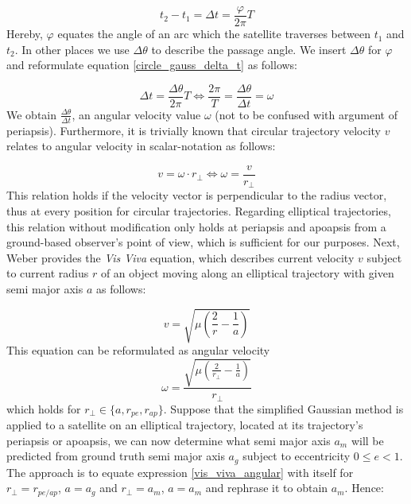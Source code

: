 \documentclass[11pt,a4paper]{article}
\begin{document}
	\begin{equation}
		\label{circle_gauss_delta_t}
		t_2 - t_1 = \Delta t=\frac{\varphi}{2\pi}T
	\end{equation} 
	\newline
	Hereby, $\varphi$ equates the angle of an arc which the satellite traverses between $t_1$ and $t_2$. \cite{orbit_determination_preliminary}\newline In other places we use $\Delta \theta$ to describe the passage angle. We insert $\Delta \theta$ for $\varphi$ and reformulate equation \ref{circle_gauss_delta_t} as follows:
	
	\begin{equation*}
		\Delta t=\frac{\Delta \theta}{2\pi}T \Leftrightarrow \frac{2\pi}{T}=\frac{\Delta \theta}{\Delta t}=\omega
	\end{equation*}
	We obtain $\frac{\Delta \theta}{\Delta t}$, an angular velocity value $\omega$ (not to be confused with argument of periapsis). Furthermore, it is trivially known that circular trajectory velocity $v$ relates to angular velocity in scalar-notation as follows:
	
	\begin{equation}
		v = \omega \cdot r_{\perp} \Leftrightarrow \omega = \frac{v}{r_{\perp}}
	\end{equation}
	This relation holds if the velocity vector is perpendicular to the radius vector, thus at every position for circular trajectories. Regarding elliptical trajectories, this relation without modification only holds at periapsis and apoapsis from a ground-based observer's point of view, which is sufficient for our purposes.\newline
	Next, Weber provides the \emph{Vis Viva} equation, which describes current velocity $v$ subject to current radius $r$ of an object moving along an elliptical trajectory with given semi major axis $a$ as follows:
	
	\begin{equation}
		\label{vis_viva}
		v=\sqrt{\mu\left(\frac{2}{r}-\frac{1}{a}\right)}
	\end{equation}
	\cite{hohmann_transfer}\newline
	This equation can be reformulated as angular velocity
	\begin{equation}
		\label{vis_viva_angular}
		\omega=\frac{\sqrt{\mu\left(\frac{2}{r_{\perp}}-\frac{1}{a}\right)}}{r_{\perp}}
	\end{equation}
	which holds for $r_{\perp}\in\{a, r_{pe}, r_{ap}\}$. Suppose that the simplified Gaussian method is applied to a satellite on an elliptical trajectory, located at its trajectory's periapsis or apoapsis, we can now determine what semi major axis $a_m$ will be predicted from ground truth semi major axis $a_g$ subject to eccentricity $0 \leq e < 1$.\newline
	The approach is to equate expression \ref{vis_viva_angular} with itself for $r_{\perp}=r_{pe/ap}$, $a=a_g$ and $r_{\perp}=a_m$, $a=a_m$ and rephrase it to obtain $a_m$. Hence:
	
\end{document}
